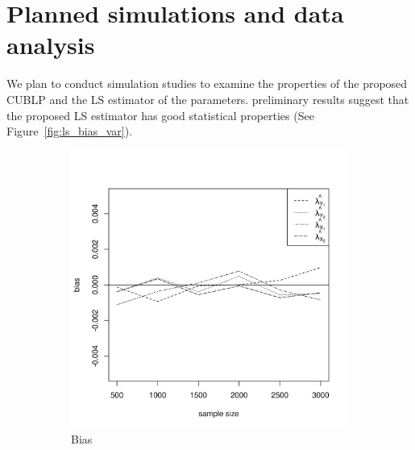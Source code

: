 \documentclass[man, floatsintext]{apa7}
\begin{document}
  \section{Planned simulations and data analysis}
  We plan to conduct simulation studies to examine the properties of the
  proposed CUBLP and the LS estimator of the parameters. preliminary results 
  suggest that the proposed LS estimator has good statistical properties (See
  Figure~\ref{fig:ls_bias_var}). 
  \begin{figure}
    \centering
    \begin{subfigure}[b]{0.4\textwidth}
      \centering
      \includegraphics[width=\textwidth]{bias_uneq_discrim_high.png}
      \caption{Bias}
    \end{subfigure}
    \begin{subfigure}[b]{0.4\textwidth}
      \centering

\end{subfigure}
\end{figure}
\end{document}
